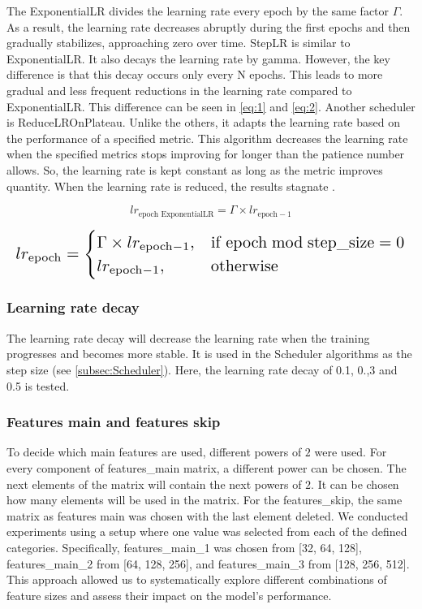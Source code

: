 \documentclass[twocolumn]{article}
\begin{document}
The ExponentialLR divides the learning rate every epoch by the same factor $\Gamma$. 
As a result, the learning rate decreases abruptly during the first epochs and then gradually stabilizes, approaching zero over time. 
StepLR is similar to ExponentialLR. It also decays the learning rate by gamma. However, the key difference is that this decay occurs only every N epochs. 
This leads to more gradual and less frequent reductions in the learning rate compared to ExponentialLR. 
This difference can be seen in \ref{eq:1} and \ref{eq:2}.
Another scheduler is ReduceLROnPlateau. Unlike the others, it adapts the learning rate based on the performance of a specified metric. 
This algorithm decreases the learning rate when the specified metrics stops improving for longer than the patience number allows. 
So, the learning rate is kept constant as long as the metric improves quantity. 
When the learning rate is reduced, the results stagnate \cite{unknown-author-no-date3} \cite{isbhargav-2020}. 

\begin{equation}\label{eq:1}
lr_{\text{epoch ExponentialLR}} = \Gamma \times lr_{\text{epoch}-1}
\end{equation}

\begin{equation}\label{eq:2}
\resizebox{1.\hsize}{!}{$
lr_{\text{epoch}} =
\begin{cases}
\Gamma \times lr_{\text{epoch}-1}, & \text{if } \text{epoch} \bmod \text{step\_size} = 0 \\
lr_{\text{epoch}-1}, & \text{otherwise}
\end{cases}
$}
\end{equation}

\subsubsection{Learning rate decay}
The learning rate decay will decrease the learning rate when the training progresses and becomes more stable. 
It is used in the Scheduler algorithms as the step size (see \ref{subsec:Scheduler}). 
Here, the learning rate decay of 0.1, 0.,3 and 0.5 is tested.

\subsubsection{Features main and features skip}
To decide which main features are used, different powers of $2$ were used. 
For every component of features\_main matrix, a different power can be chosen. 
The next elements of the matrix will contain the next powers of $2$. It can be chosen how many elements will be used in the matrix. 
For the features\_skip, the same matrix as features main was chosen with the last element deleted. 
We conducted experiments using a setup where one value was selected from each of the defined categories. 
Specifically, features\_main\_1 was chosen from [32, 64, 128], features\_main\_2 from [64, 128, 256], and features\_main\_3 from [128, 256, 512]. 
This approach allowed us to systematically explore different combinations of feature sizes and assess their impact on the model's performance.
\end{document}
